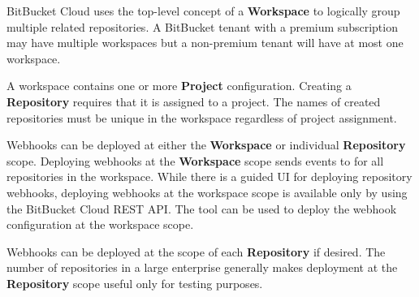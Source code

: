 BitBucket Cloud uses the top-level concept of a \textbf{Workspace} to logically group multiple
related repositories.  A BitBucket tenant with a premium subscription may have multiple workspaces
but a non-premium tenant will have at most one workspace.

A workspace contains one or more \textbf{Project} configuration.  Creating a \textbf{Repository}
requires that it is assigned to a project.  The names of created repositories must be unique
in the workspace regardless of project assignment.

Webhooks can be deployed at either the \textbf{Workspace} or individual \textbf{Repository} scope.
Deploying webhooks at the \textbf{Workspace} scope sends events to \cxoneflow for all repositories
in the workspace.  While there is a guided UI for deploying repository webhooks, deploying webhooks
at the workspace scope is available only by using the BitBucket Cloud REST API.  The \cxoneflowaudit
tool can be used to deploy the webhook configuration at the workspace scope.

Webhooks can be deployed at the scope of each \textbf{Repository} if desired.  The number of repositories
in a large enterprise generally makes deployment at the \textbf{Repository} scope useful
only for testing purposes.
